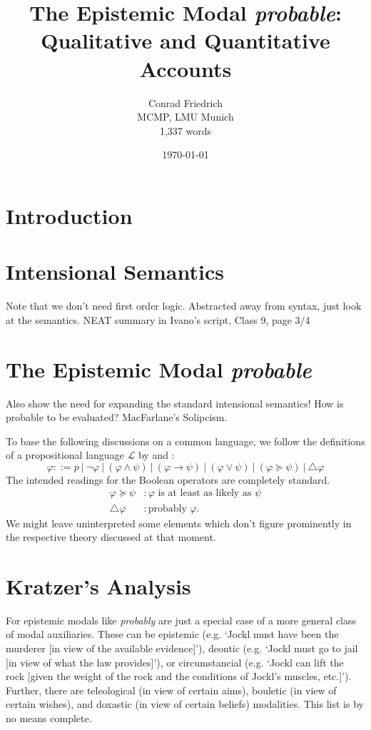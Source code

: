 \documentclass{article}
\title{The Epistemic Modal \emph{probable}: Qualitative and Quantitative Accounts}
\author{Conrad Friedrich \\ MCMP, LMU Munich \\ 1,337 words}
\date{\today}
\renewcommand{\L}{\mathcal{L}}
\begin{document}
\onehalfspacing
\maketitle

\section{Introduction}


\section{Intensional Semantics}
Note that we don't need first order logic. 
Abstracted away from syntax, just look at the semantics.
NEAT summary in Ivano's script, Class 9, page 3/4
\section{The Epistemic Modal \emph{probable}}
Also show the need for expanding the standard intensional semantics!
How is probable to be evaluated? MacFarlane's Solipcism. 

To base the following discussions on a common language, we follow the definitions of a propositional language $\L$ by \textcite{harrison-trainor17_prefer} and \textcite{holliday13_measur}:
\[
\varphi ::= p ~|~ \neg \varphi ~|~ (\varphi \land \psi) ~|~ (\varphi \rightarrow \psi) ~|~ (\varphi \vee \psi) ~|~ (\varphi \succeq \psi) ~|~ \triangle\varphi 
\]
The intended readings for the Boolean operators are completely standard.
\begin{align*}
  \varphi \succeq \psi &: \varphi \text{ is at least as likely as } \psi \\
  \triangle \varphi &:\text{probably } \varphi.
\end{align*}
We might leave uninterpreted some elements which don't figure prominently in the respective theory discussed at that moment.

\section{Kratzer's Analysis}

For \textcite{kratzer91_modal} epistemic modals like \emph{probably} are just a special case of a more general class of modal auxiliaries.
These can be epistemic (e.g. `Jockl must have been the murderer [in view of the available evidence]'), deontic (e.g. `Jockl must go to jail [in view of what the law provides]'), or circumstancial (e.g. `Jockl can lift the rock [given the weight of the rock and the conditions of Jockl's muscles, etc.]').
Further, there are teleological (in view of certain aims), bouletic (in view of certain wishes), and doxastic (in view of certain beliefs) modalities.
This list is by no means complete.
\end{document}
